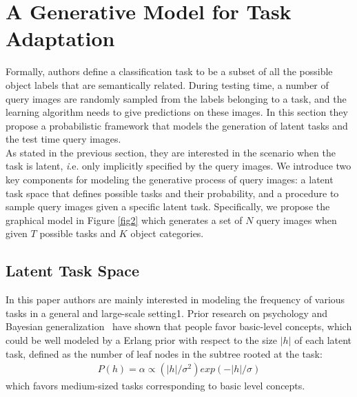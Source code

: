 \documentclass[10pt,twocolumn,letterpaper]{article}
\begin{document}
\section{A Generative Model for Task Adaptation}
Formally, authors define a classification task to be a subset of all the possible object labels that are semantically related. During testing time, a number of query images are randomly sampled from the labels belonging to a task, and the learning algorithm needs to give predictions on these images. In this section they propose a probabilistic framework that models the generation of latent tasks and the test time query images.\\
\indent As stated in the previous section, they are interested in the scenario when the task is latent, {\emph i.e.} only implicitly specified by the query images. We introduce two key components for modeling the generative process of query images: a latent task space that defines possible tasks and their probability, and a procedure to sample query images given a specific latent task. Specifically, we propose the graphical model in Figure \ref{fig2} which generates a set of $N$ query images when given $T$ possible tasks and $K$ object categories. 
\subsection{Latent Task Space}
\balance
In this paper authors are mainly interested in modeling the frequency of various tasks in a general and large-scale setting1. Prior research on psychology and Bayesian generalization~\cite{bayesian,Generalization} have shown that people favor basic-level concepts, which could be well modeled by a Erlang prior with respect to the size $|h|$ of each latent task, defined as the number of leaf nodes in the subtree rooted at the task:
\begin{gather}
P(h) = \alpha \varpropto (|h|/\sigma^2)exp(-|h|/\sigma)
\end{gather}
which favors medium-sized tasks corresponding to basic level concepts.
{\small


}
\end{document}
